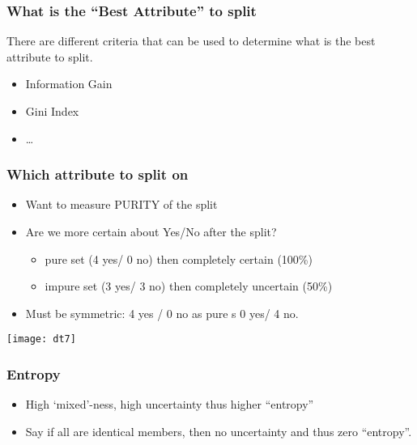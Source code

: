 \begin{frame}[fragile]\frametitle{What is the ``Best Attribute'' to split}
There are different criteria that can be used to determine what 
is the best attribute to split.
\begin{itemize}
\item Information Gain
\item Gini Index
\item \ldots
\end{itemize}
\end{frame}

\begin{frame}[fragile]\frametitle{Which attribute to split on}

	\begin{itemize}
	\item Want to measure PURITY of the split
	\item Are we more certain about Yes/No after the split?
		\begin{itemize}
		\item pure set (4 yes/ 0 no) then completely certain (100\%)
		\item impure set (3 yes/ 3 no) then completely uncertain (50\%)
		\end{itemize}
	\item Must be symmetric: 4 yes / 0 no as pure s 0 yes/ 4 no.
	\end{itemize}
\begin{center}
\texttt{[image: dt7]}
\end{center}
\end{frame}

\begin{frame}[fragile]\frametitle{Entropy}
\begin{itemize}
\item High `mixed'-ness, high uncertainty thus higher ``entropy''
\item Say if  all are identical members, then no uncertainty and thus zero ``entropy''.
\end{itemize}
\end{frame}

